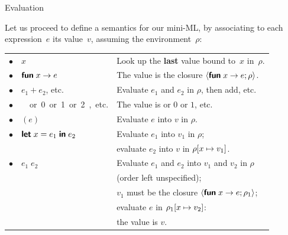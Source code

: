 %
\begin{frame}{Evaluation}

  Let us proceed to define a semantics for our mini-ML, by associating
  to each expression~\(e\) its value~\(v\), assuming the
  environment~\(\rho\):

  \bigskip

  \begin{tabular}{r@{\,\,}ll@{}}
    $\bullet$
  & $x$
  & Look up the \textbf{last} value bound to~\(x\) in~\(\rho\).\\
    $\bullet$
  & $\textsf{\textbf{fun}} \; x \rightarrow e$
  & The value is the closure $\langle \textsf{\textbf{fun}} \; x \rightarrow e; \rho \rangle$.\\
    $\bullet$
  & $e_1 + e_2$, etc.
  & Evaluate $e_1$ and $e_2$ in $\rho$, then add, etc.\\
    $\bullet$
  & \unit \ or \num{0} or \num{1} or \num{2}, etc.
  & The value is \unit or $0$ or $1$, etc.\\
    $\bullet$
  & $(e)$
  & Evaluate $e$ into $v$ in $\rho$.\\
    $\bullet$
  & $\textsf{\textbf{let}} \; x = e_1 \; \textsf{\textbf{in}} \; e_2$
  & Evaluate $e_1$ into $v_1$ in $\rho$;\\
  &
  & evaluate $e_2$ into $v$ in $\rho[x \mapsto v_1]$.\\
    $\bullet$
  & $e_1 \; e_2$
  & Evaluate $e_1$ and $e_2$ into $v_1$ and $v_2$ in $\rho$\\
  &
  & (order left unspecified);\\
  &
  & $v_1$ must be the closure $\langle \textsf{\textbf{fun}} \; x \rightarrow e; \rho_1 \rangle$;\\
  &
  & evaluate $e$ in $\rho_1[x \mapsto v_2]$:\\
  && the value is $v$.
\end{tabular}

\end{frame}

